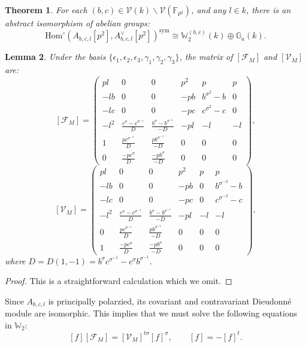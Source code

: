 \documentclass[a4paper,12pt,twoside]{report}
\newtheorem{theorem}{Theorem}[section]
\newtheorem{lemma}[theorem]{Lemma}
\newcommand{\F}{\mathbb{F}}
\newcommand{\G}{\mathbb{G}}
\newcommand{\Hom}{\mathrm{Hom}}
\newcommand{\W}{\mathbb{W}}
\newcommand{\sym}{\mathrm{sym}}
\begin{document}
\begin{theorem}\label{explicitHom}
    For each $(b,c)\in \mathcal{V}(k)\backslash \mathcal{V}(\F_{p^2})$, and any $l\in k$, 
    there is an abstract isomorphism of abelian groups: 
    \[ \Hom^{\circ}(A_{b,c,l}[p^2],A_{b,c,l}^{\vee}[p^2])^{\sym}\cong \W_2^{(b,c)}(k)\oplus\G_a(k).\]
\end{theorem}

\begin{lemma}
    Under the basis $\{\epsilon_1,\epsilon_2,\epsilon_3,\gamma_1,\gamma_2,\gamma_3\}$, 
    the matrix of $[\mathcal{F}_M]$ and $[\mathcal{V}_M]$ are: 
    \[[\mathcal{F}_M]=\left(\begin{matrix}
        pl&0&0&p^2&p&p\\
        -lb&0&0&-pb&b^{\sigma^2}-b& 0\\
        -lc&0&0&-pc&c^{\sigma^2}-c&0\\
        -l^2&\frac{c^{\sigma}-c^{\sigma^{-1}}}{D}&\frac{b^{\sigma}-b^{\sigma^{-1}}}{-D}&-pl&-l&-l\\
        1& \frac{pc^{\sigma^{-1}}}{D}&\frac{pb^{\sigma^{-1}}}{-D}&0&0&0\\
        0&\frac{-pc^{\sigma}}{D}& \frac{-pb^{\sigma}}{-D}&0&0&0
    \end{matrix}\right),\]
    \[[\mathcal{V}_M]=\left(\begin{matrix}
        pl&0&0&p^2&p&p\\
        -lb&0&0&-pb&0& b^{\sigma^{-2}}-b\\
        -lc&0&0&-pc&0&c^{\sigma^{-2}}-c\\
        -l^2&\frac{c^{\sigma}-c^{\sigma^{-1}}}{D}&\frac{b^{\sigma}-b^{\sigma^{-1}}}{-D}&-pl&-l&-l\\
        0& \frac{pc^{\sigma^{-1}}}{D}&\frac{pb^{\sigma^{-1}}}{-D}&0&0&0\\
        1&\frac{-pc^{\sigma}}{D}& \frac{-pb^{\sigma}}{-D}&0&0&0
    \end{matrix}\right),\] 
where $D=D(1,-1)=b^{\sigma}c^{\sigma^{-1}}-c^{\sigma}b^{\sigma^{-1}}$. 
\end{lemma}

\begin{proof} 
    This is a straightforward calculation which we omit. 
\end{proof}

Since $A_{b,c,l}$ is principally polarzied, its covariant and contravariant Dieudonné module are isomorphic. 
This implies that we must solve the following equations in $\W_2$: 
\[[f][\mathcal{F}_M]=[\mathcal{V}_M]^{t\sigma}[f]^\sigma,\qquad [f]=-[f]^t.\]
\end{document}
